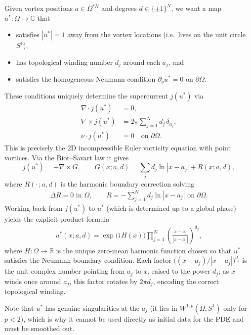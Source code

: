 \documentclass[12pt, a4paper]{article}
\theoremstyle{plain}
\theoremstyle{definition}
\newcommand{\R}{\mathbb{R}}
\newcommand{\C}{\mathbb{C}}
\newcommand{\abs}[1]{\left\lvert #1 \right\rvert}
\begin{document}
Given vortex positions $a \in \Omega^{*N}$ and degrees $d \in \{\pm 1\}^N$,
we want a map $u^*\colon\Omega \to \C$ that
\begin{itemize}
  \item satisfies $\abs{u^*} = 1$ away from the vortex locations
        (i.e.\ lives on the unit circle $S^1$),
  \item has topological winding number $d_j$ around each $a_j$, and
  \item satisfies the homogeneous Neumann condition
        $\partial_\nu u^* = 0$ on $\partial\Omega$.
\end{itemize}
These conditions uniquely determine the supercurrent $j(u^*)$ via
\begin{align}
  \nabla \cdot j(u^*) &= 0,
  \label{eq:ustar-div}\\
  \nabla \times j(u^*) &= 2\pi\sum_{j=1}^N d_j\,\delta_{a_j},
  \label{eq:ustar-curl}\\
  \nu \cdot j(u^*) &= 0 \quad\text{on } \partial\Omega.
  \label{eq:ustar-bc}
\end{align}
This is precisely the 2D incompressible Euler vorticity equation with
point vortices. Via the Biot--Savart law it gives
\[
  j(u^*) = -\nabla \times G,
  \qquad
  G(x; a,d) = \sum_j d_j \ln\abs{x-a_j} + R(x; a,d),
\]
where $R(\cdot\,;a,d)$ is the harmonic boundary correction solving
\begin{align}
  \Delta R = 0 \text{ in } \Omega, \qquad
  R = -\sum_{j=1}^N d_j \ln\abs{x - a_j} \text{ on } \partial\Omega.
  \label{eq:R-laplace}
\end{align}
Working back from $j(u^*)$ to $u^*$ (which is determined up to a global phase)
yields the explicit product formula
\begin{align}
  u^*(x; a,d)
  = \exp\!\bigl(\mathrm{i}\,H(x)\bigr)
    \prod_{j=1}^N
    \left(\frac{x - a_j}{\abs{x - a_j}}\right)^{\!d_j},
  \label{eq:ustar}
\end{align}
where $H\colon\Omega \to \R$ is the unique zero-mean harmonic function
chosen so that $u^*$ satisfies the Neumann boundary condition.
Each factor $\bigl((x-a_j)/\abs{x-a_j}\bigr)^{d_j}$ is the unit complex number
pointing from $a_j$ to $x$, raised to the power $d_j$;
as $x$ winds once around $a_j$, this factor rotates by $2\pi d_j$,
encoding the correct topological winding.

Note that $u^*$ has genuine singularities at the $a_j$
(it lies in $W^{1,p}(\Omega, S^1)$ only for $p < 2$),
which is why it cannot be used directly as initial data for the PDE
and must be smoothed out.
\end{document}
